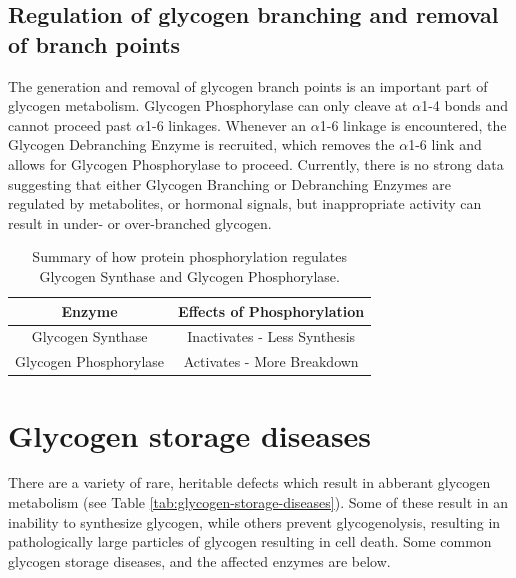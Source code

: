 \documentclass{tufte-handout}
\begin{document}
\subsection{Regulation of glycogen branching and removal of branch points}

The generation and removal of glycogen branch points is an important part of glycogen metabolism.  Glycogen Phosphorylase can only cleave at $\alpha$1-4 bonds and cannot proceed past $\alpha$1-6 linkages.  Whenever an $\alpha$1-6 linkage is encountered, the Glycogen Debranching Enzyme is recruited, which removes the $\alpha$1-6 link and allows for Glycogen Phosphorylase to proceed.  Currently, there is no strong data suggesting that either Glycogen Branching or Debranching Enzymes are regulated by metabolites, or hormonal signals, but inappropriate activity can result in under- or over-branched glycogen.


\begin{table}
\centering
\caption{Summary of how protein phosphorylation regulates Glycogen Synthase and Glycogen Phosphorylase.}
\label{tab:gs-gp-phosphorylation}
\begin{tabular}{cc}
\hline
\textbf {Enzyme} & \textbf{Effects of Phosphorylation}  \\
\hline
Glycogen Synthase & Inactivates - Less Synthesis \\
Glycogen Phosphorylase & Activates - More Breakdown\\
\hline
\end{tabular}
\end{table}

\section{Glycogen storage diseases}

There are a variety of rare, heritable defects which result in abberant glycogen metabolism (see Table \ref{tab:glycogen-storage-diseases}).  Some of these result in an inability to synthesize glycogen, while others prevent glycogenolysis, resulting in pathologically large particles of glycogen resulting in cell death.  Some common glycogen storage diseases, and the affected enzymes are below.   
\end{document}
